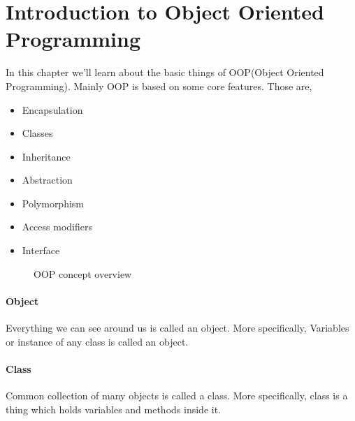 \documentclass[openany]{book}  %
\begin{document}
\chapter{Introduction to Object Oriented Programming}
In this chapter we'll learn about the basic things of OOP(Object Oriented Programming).
Mainly OOP is based on some core features. Those are,
\begin{itemize}
    \item Encapsulation
    \item Classes
    \item Inheritance
    \item Abstraction
    \item Polymorphism
    \item Access modifiers
    \item Interface
\end{itemize}
% 
% 
\begin{figure}[htbp]
    \begin{center}
        \caption{OOP concept overview}
    \end{center}
\end{figure}

\newpage

% 
% 
\subsubsection{Object}
Everything we can see around us is called an object. More specifically,
Variables or instance of any class is called an object.
% 
% 
\subsubsection{Class}
Common collection of many objects is called a class. More specifically,
class is a thing which holds variables and methods inside it.
% 
% 
\end{document}
